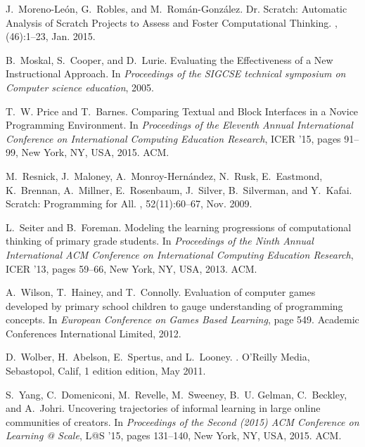 \documentclass{sig-alternate-05-2015}
\begin{document}
\begin{thebibliography}{10}
	J.~Moreno-Le{\'o}n, G.~Robles, and M.~Rom{\'a}n-Gonz{\'a}lez.
	\newblock Dr. {Scratch}: {Automatic} {Analysis} of {Scratch} {Projects} to
	{Assess} and {Foster} {Computational} {Thinking}.
	, (46):1--23, Jan.
	2015.
	
	B.~Moskal, S.~Cooper, and D.~Lurie.
	\newblock Evaluating the {Effectiveness} of a {New} {Instructional} {Approach}.
	\newblock In {\em Proceedings of the {SIGCSE} technical symposium on {Computer}
		science education}, 2005.
	
	T.~W. Price and T.~Barnes.
	\newblock Comparing {Textual} and {Block} {Interfaces} in a {Novice}
	{Programming} {Environment}.
	\newblock In {\em Proceedings of the {Eleventh} {Annual} {International}
		{Conference} on {International} {Computing} {Education} {Research}}, {ICER}
	'15, pages 91--99, New York, NY, USA, 2015. ACM.
	
	M.~Resnick, J.~Maloney, A.~Monroy-Hernández, N.~Rusk, E.~Eastmond, K.~Brennan,
	A.~Millner, E.~Rosenbaum, J.~Silver, B.~Silverman, and Y.~Kafai.
	\newblock Scratch: {Programming} for {All}.
	, 52(11):60--67, Nov. 2009.
	
	L.~Seiter and B.~Foreman.
	\newblock Modeling the learning progressions of computational thinking of
	primary grade students.
	\newblock In {\em Proceedings of the Ninth Annual International ACM Conference
		on International Computing Education Research}, ICER '13, pages 59--66, New
	York, NY, USA, 2013. ACM.
	
	A.~Wilson, T.~Hainey, and T.~Connolly.
	\newblock Evaluation of computer games developed by primary school children to
	gauge understanding of programming concepts.
	\newblock In {\em European Conference on Games Based Learning}, page 549.
	Academic Conferences International Limited, 2012.
	
	D.~Wolber, H.~Abelson, E.~Spertus, and L.~Looney.
	.
	\newblock O'Reilly Media, Sebastopol, Calif, 1 edition edition, May 2011.
	
	S.~Yang, C.~Domeniconi, M.~Revelle, M.~Sweeney, B.~U. Gelman, C.~Beckley, and
	A.~Johri.
	\newblock Uncovering trajectories of informal learning in large online
	communities of creators.
	\newblock In {\em Proceedings of the Second (2015) ACM Conference on Learning @
		Scale}, L@S '15, pages 131--140, New York, NY, USA, 2015. ACM.
	
\end{thebibliography}
\end{document}
